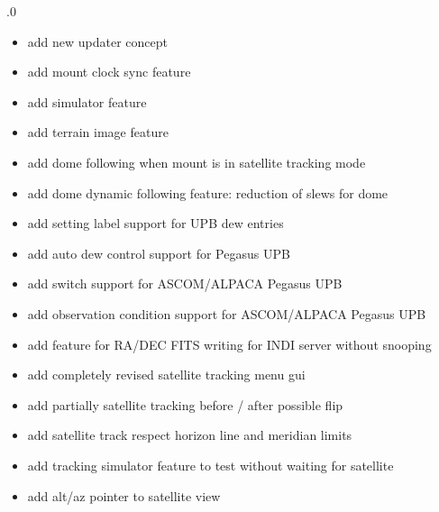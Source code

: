 \documentclass[a4paper,10pt,english]{sphinxmanual}
\begin{document}
.0
\begin{itemize}
\item {} 
\sphinxAtStartPar
add new updater concept

\item {} 
\sphinxAtStartPar
add mount clock sync feature

\item {} 
\sphinxAtStartPar
add simulator feature

\item {} 
\sphinxAtStartPar
add terrain image feature

\item {} 
\sphinxAtStartPar
add dome following when mount is in satellite tracking mode

\item {} 
\sphinxAtStartPar
add dome dynamic following feature: reduction of slews for dome

\item {} 
\sphinxAtStartPar
add setting label support for UPB dew entries

\item {} 
\sphinxAtStartPar
add auto dew control support for Pegasus UPB

\item {} 
\sphinxAtStartPar
add switch support for ASCOM/ALPACA Pegasus UPB

\item {} 
\sphinxAtStartPar
add observation condition support for ASCOM/ALPACA Pegasus UPB

\item {} 
\sphinxAtStartPar
add feature for RA/DEC FITS writing for INDI server without snooping

\item {} 
\sphinxAtStartPar
add completely revised satellite tracking menu gui

\item {} 
\sphinxAtStartPar
add partially satellite tracking before / after possible flip

\item {} 
\sphinxAtStartPar
add satellite track respect horizon line and meridian limits

\item {} 
\sphinxAtStartPar
add tracking simulator feature to test without waiting for satellite

\item {} 
\sphinxAtStartPar
add alt/az pointer to satellite view


\end{itemize}
\end{document}
